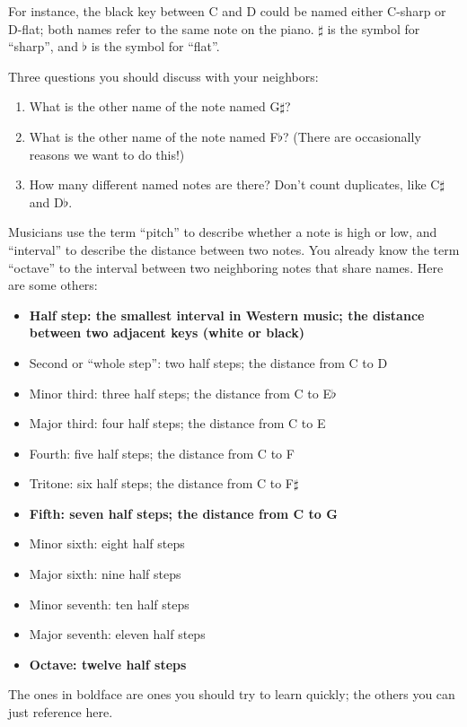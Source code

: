 \documentclass[10pt]{article}
\begin{document}
For instance, the black key between C and D could be named either C-sharp or D-flat; both names refer to the same note
on the piano. $\sharp$ is the symbol for ``sharp'', and $\flat$ is the symbol for ``flat''.

Three questions you should discuss with your neighbors:

\begin{enumerate}
\item What is the other name of the note named G$\sharp$?
\item What is the other name of the note named F$\flat$? (There are occasionally reasons we want to do this!)
\item How many different named notes are there? Don't count duplicates, like C$\sharp$ and D$\flat$.
\end{enumerate}


Musicians use the term ``pitch'' to describe whether a note is high or low, and ``interval'' to 
describe the distance between two notes. You already know the term ``octave''
to the interval between two neighboring notes that share names. Here are some others:

\begin{itemize}
\item {\bf Half step: the smallest interval in Western music; the distance between two adjacent keys (white or black)}
\item Second or ``whole step'': two half steps; the distance from C to D
\item Minor third: three half steps; the distance from C to E$\flat$
\item Major third: four half steps; the distance from C to E
\item Fourth: five half steps; the distance from C to F
\item Tritone: six half steps; the distance from C to F$\sharp$
\item {\bf Fifth: seven half steps; the distance from C to G}
\item Minor sixth: eight half steps
\item Major sixth: nine half steps
\item Minor seventh: ten half steps
\item Major seventh: eleven half steps
\item {\bf Octave: twelve half steps}
\end{itemize}

The ones in boldface are ones you should try to learn quickly; the others you can just reference here.
\end{document}
